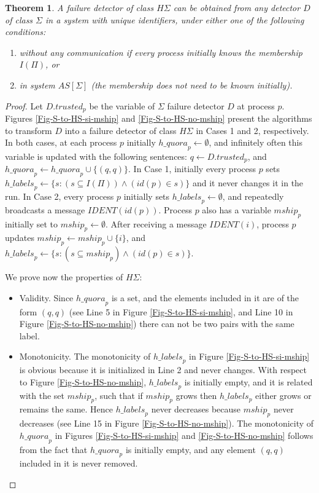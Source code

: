 \documentclass[10pt, conference, compsocconf]{IEEEtran}
\newtheorem{theorem}{Theorem}
\newcommand{\HS}{{H\Sigma}}
\newcommand{\quora}{{\mathit{h\_quora}}}
\newcommand{\labels}{{\mathit{h\_labels}}}
\begin{document}
\begin{theorem}
\label{HS-Sigma}
A failure detector of class $\HS$ can be obtained from any detector $D$ of class $\Sigma$ in a system with unique identifiers, under either one of the following conditions:
\begin{enumerate} 
\item without any communication if every process initially knows the membership $I(\Pi)$, or 
\item in system $AS[\Sigma]$ (the membership does not need to be known initially). 
\end{enumerate} 
\end{theorem}
\begin{proof}
Let $D.trusted_p$ be the variable of $\Sigma$ failure detector $D$ at process $p$. 
Figures \ref{Fig-S-to-HS-si-mship} and \ref{Fig-S-to-HS-no-mship} present the algorithms to transform $D$ into a 
failure detector of class $\HS$ in Cases 1 and 2, respectively.
In both cases, at each process $p$ initially
$\quora_p \leftarrow \emptyset$, and infinitely often this variable is updated with the following sentences: 
$q \leftarrow D.trusted_p$, and $\quora_p  \leftarrow \quora_p \cup \{(q,q)\}$. In Case 1, initially every process $p$ sets 
$\labels_p \leftarrow \{s: (s \subseteq I(\Pi)) \wedge (id(p) \in s)\}$ and it never changes it in the run. In Case 2, every process $p$
initially sets $\labels_p \leftarrow \emptyset$, and repeatedly broadcasts a message $\mathit{IDENT}(id(p))$. Process $p$ also has a variable $mship_p$ initially set
to $mship_p \leftarrow \emptyset$. After receiving a message $\mathit{IDENT}(i)$, process $p$ updates 
$mship_p \leftarrow mship_p \cup \{i\}$, and $\labels_p \leftarrow \{s: (s \subseteq mship_p) \wedge (id(p) \in s)\}$. 

We prove now the properties of $\HS$:

\begin{itemize}
\item Validity.
Since $\quora_p$ is a set, and the elements included in it are of the form $(q,q)$ (see Line 5 in Figure \ref{Fig-S-to-HS-si-mship}, and Line 10 in Figure \ref{Fig-S-to-HS-no-mship}) there can not be two pairs with the same label.

\item Monotonicity.
The monotonicity of $\labels_p$ in Figure \ref{Fig-S-to-HS-si-mship} is obvious because it is initialized in Line 2 and never changes. With respect to Figure \ref{Fig-S-to-HS-no-mship}, $\labels_p$ is initially empty, and it is related with the set $mship_p$, such that if $mship_p$ grows then $\labels_p$ either grows or remains the same. Hence $\labels_p$ never decreases because $mship_p$ never decreases (see Line 15 in Figure \ref{Fig-S-to-HS-no-mship}). 
The monotonicity of $\quora_p$ in Figures \ref{Fig-S-to-HS-si-mship} and \ref{Fig-S-to-HS-no-mship} follows from the fact that $\quora_p$ is initially empty, and any element $(q,q)$ included in it is never removed.


\end{itemize}
\end{proof}
\end{document}
